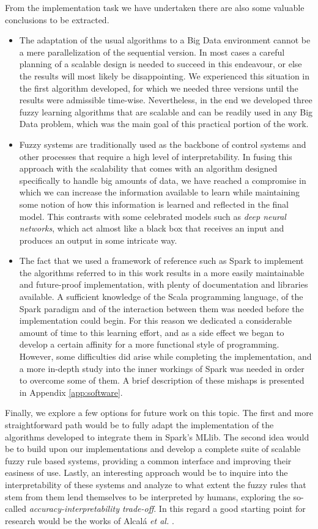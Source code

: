 From the implementation task we have undertaken there are also some valuable conclusions to be extracted.

\begin{itemize}
  \item The adaptation of the usual algorithms to a Big Data environment cannot be a mere parallelization of the sequential version. In most cases a careful planning of a scalable design is needed to succeed in this endeavour, or else the results will most likely be disappointing. We experienced this situation in the first algorithm developed, for which we needed three versions until the results were admissible time-wise. Nevertheless, in the end we developed three fuzzy learning algorithms that are scalable and can be readily used in any Big Data problem, which was the main goal of this practical portion of the work.
  \item Fuzzy systems are traditionally used as the backbone of control systems and other processes that require a high level of interpretability. In fusing this approach with the scalability that comes with an algorithm designed specifically to handle big amounts of data, we have reached a compromise in which we can increase the information available to learn while maintaining some notion of how this information is learned and reflected in the final model. This contrasts with some celebrated models such as \textit{deep neural networks}, which act almost like a black box that receives an input and produces an output in some intricate way.
  \item The fact that we used a framework of reference such as Spark to implement the algorithms referred to in this work results in a more easily maintainable and future-proof implementation, with plenty of documentation and libraries available. A sufficient knowledge of the Scala programming language, of the Spark paradigm and of the interaction between them was needed before the implementation could begin. For this reason we dedicated a considerable amount of time to this learning effort, and as a side effect we began to develop a certain affinity for a more functional style of programming. However, some difficulties did arise while completing the implementation, and a more in-depth study into the inner workings of Spark was needed in order to overcome some of them. A brief description of these mishaps is presented in Appendix \ref{app:software}.
\end{itemize}

Finally, we explore a few options for future work on this topic. The first and more straightforward path would be to fully adapt the implementation of the algorithms developed to integrate them in Spark's MLlib. The second idea would be to build upon our implementations and develop a complete suite of scalable fuzzy rule based systems, providing a common interface and improving their easiness of use. Lastly, an interesting approach would be to inquire into the interpretability of these systems and analyze to what extent the fuzzy rules that stem from them lend themselves to be interpreted by humans, exploring the so-called \textit{accuracy-interpretability trade-off}. In this regard a good starting point for research would be the works of Alcalá \textit{et al.} \cite{hybrid2006alcala,gacto2011interpretability}.
